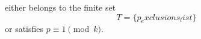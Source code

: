 either belongs to the finite set 
\begin{equation*}
T=\{{p_exclusions_list}\}
\end{equation*}
or satisfies $p\equiv 1 \pmod{{k}}$.